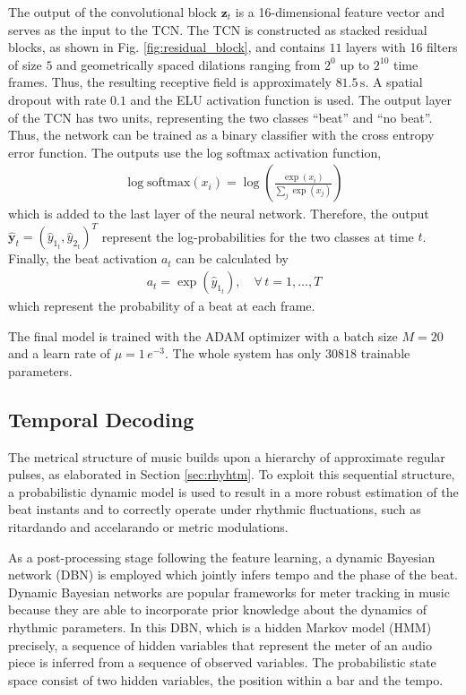 \documentclass{scrartcl}
\begin{document}
The output of the convolutional block $\mathbf z_t$ is a 16-dimensional feature vector and serves as the input to the TCN. The TCN is constructed as stacked residual blocks, as shown in Fig. \ref{fig:residual_block}, and contains $11$ layers with 16 filters of size $5$ and geometrically spaced di\-lations ranging from $2^0$ up to $2^{10}$ time frames. Thus, the resulting receptive field is approximately $81.5\,\text{s}$. A spatial dropout with rate $0.1$ and the ELU activation function is used. The output layer of the TCN has two units, representing the two classes ``beat'' and ``no beat''. Thus, the network can be trained as a binary classifier with the cross entropy error function. The outputs use the log softmax activation function, 
\begin{align}
\log \text{softmax}(x_i) = \log\left(\frac{\exp{(x_i)}}{\sum_j \exp(x_j)}\right)
\end{align} 
which is added to the last layer of the neural network. Therefore, the output $\hat{\mathbf y}_t = (\hat{y}_{1_t}, \hat{y}_{2_t})^T$ represent the log-probabilities for the two classes at time $t$. Finally, the beat activation $a_t$ can be calculated by
\begin{align}
a_t = \exp \left({\hat{y}_{1_t}} \right), \quad \forall \, t= 1,\dots,T
\end{align}  
which represent the probability of a beat at each frame.

The final model is trained with the ADAM optimizer \cite{Kingma2014} with a batch size $M = 20$ and a learn rate of $\mu = 1 \,e^{-3}$. The whole system has only $30818$ trainable parameters. 



\subsection{Temporal Decoding}
\label{sec:temporal_decoding}

The metrical structure of music builds upon a hierarchy of approximate regular pulses, as elaborated in Section \ref{sec:rhyhtm}. To exploit this sequential structure, a probabilistic dynamic model is used to result in a more robust estimation of the beat instants and to correctly operate under rhythmic fluctuations, such as ritardando and accelarando or metric modulations.

As a post-processing stage following the feature learning, a dynamic Bayesian network (DBN) is employed which jointly infers tempo and the phase of the beat. Dynamic Bayesian networks are popular frameworks for meter tracking in music because they are able to incorporate prior knowledge about the dynamics of rhythmic parameters. 
In this DBN, which is a hidden Markov model (HMM) precisely, a sequence of hidden variables that represent the meter of an audio piece is inferred from a sequence of observed variables. The probabilistic state space consist of two hidden variables, the position within a bar and the tempo. 
\end{document}
